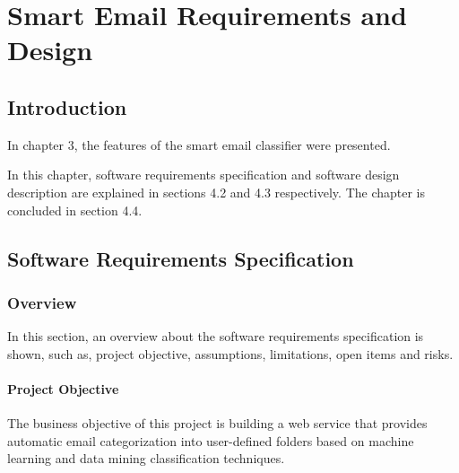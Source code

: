 \newenvironment{my_desc}
{\begin{description}
  \setlength{\itemsep}{0cm}
  \setlength{\parskip}{0cm}}
{\end{description}}

\chapter{Smart Email Requirements and Design} %

\label{Chapter4} %


\section{Introduction}
In chapter 3, the features of the smart email classifier were presented.

In this chapter, software requirements specification and software design
description are explained in sections 4.2 and 4.3 respectively. The chapter is
concluded in section 4.4.

\section{Software Requirements Specification} %
\subsection{Overview}
In this section, an overview about the software requirements specification
is shown, such as, project objective, assumptions, limitations, open items
and risks.

\subsubsection{Project Objective}
The business objective of this project is building a web service that provides
automatic email categorization into user-defined folders based on machine 
learning and data mining classification techniques.


